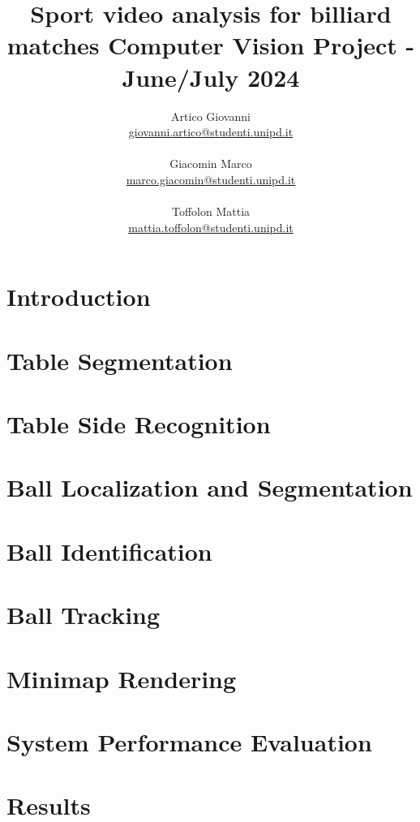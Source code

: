 \documentclass{article}
\title{\huge \textbf{Sport video analysis for billiard matches} \newline \Large Computer Vision Project - June/July 2024
}
\author{Artico Giovanni \\ \href{mailto:giovanni.artico@studenti.unipd.it}{giovanni.artico@studenti.unipd.it} \\ \\
        Giacomin Marco \\  \href{mailto:marco.giacomin@studenti.unipd.it}{marco.giacomin@studenti.unipd.it} \\ \\
        Toffolon Mattia \\ \href{mailto:mattia.toffolon@studenti.unipd.it}{mattia.toffolon@studenti.unipd.it}}
\date{}
\begin{document}
\maketitle
\vspace{10mm}
\tableofcontents
\thispagestyle{empty}

\newpage

\section{Introduction}


\section{Table Segmentation}


\section{Table Side Recognition}


\section{Ball Localization and Segmentation}


\section{Ball Identification}


\section{Ball Tracking}


\section{Minimap Rendering}


\section{System Performance Evaluation}
\label{sec:performance}


\section{Results}

\end{document}
